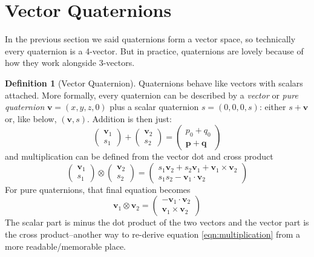 \documentclass{amsart}
\theoremstyle{definition}
\newtheorem{definition}[theorem]{Definition}
\theoremstyle{remark}
\numberwithin{equation}{section}
\begin{document}
\section{Vector Quaternions}
In the previous section we said quaternions form a vector space, so technically every quaternion is a 4-vector. But in practice, quaternions are lovely because of how they work alongside 3-vectors.
\begin{definition}[Vector Quaternion]
  Quaternions behave like vectors with scalars attached. More formally, every quaternion can be described by a \emph{vector} or \emph{pure quaternion} $\mathbf{v}=\left(x, y, z, 0\right)$ plus a scalar quaternion $s=\left(0,0,0,s\right)$: either $s+\mathbf{v}$ or, like below, $(\mathbf{v}, s)$. Addition is then just:
  \begin{equation}
    \begin{pmatrix}
      \mathbf{v}_1 \\
      s_1
    \end{pmatrix}
    +
    \begin{pmatrix}
      \mathbf{v}_2 \\
      s_2
    \end{pmatrix}
    =
    \begin{pmatrix}
      p_0+q_0 \\
      \mathbf{p} + \mathbf{q}
    \end{pmatrix}
  \end{equation}
  and multiplication can be defined from the vector dot and cross product
  \begin{equation}
    \begin{pmatrix}
      \mathbf{v}_1 \\
      s_1
    \end{pmatrix}
    \otimes
    \begin{pmatrix}
      \mathbf{v}_2 \\
      s_2
    \end{pmatrix}
    =
    \begin{pmatrix}
      s_1\mathbf{v}_2 + s_2\mathbf{v}_1 + \mathbf{v}_1\times \mathbf{v}_2 \\
      s_1s_2 - \mathbf{v}_1\cdot \mathbf{v}_2
    \end{pmatrix}
  \end{equation}
  For pure quaternions, that final equation becomes
  \begin{equation}
    \mathbf{v}_1\otimes\mathbf{v}_2 =
    \begin{pmatrix}
      -\mathbf{v}_1\cdot \mathbf{v}_2\\
      \mathbf{v}_1 \times \mathbf{v}_2
    \end{pmatrix}
  \end{equation}
  The scalar part is minus the dot product of the two vectors and the vector part is the cross product--another way to re-derive equation \ref{eqn:multiplication} from a more readable/memorable place.\end{definition}
\end{document}

